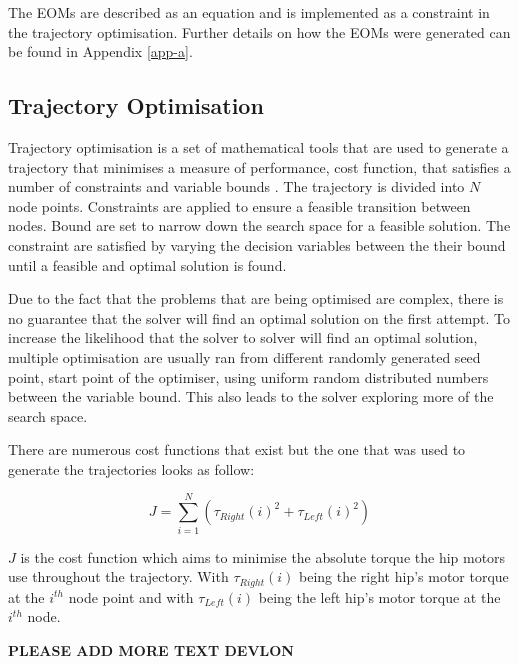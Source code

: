     The EOMs are described as an equation and is implemented as a constraint in the trajectory optimisation. Further details on how the EOMs were generated can be found in Appendix \ref{app-a}.
    
    \subsection{Trajectory Optimisation}
    Trajectory optimisation is a set of mathematical tools that are used to generate a trajectory that minimises a measure of performance, cost function, that satisfies a number of constraints and variable bounds \cite{Fisher-2020}. The trajectory is divided into $N$ node points. Constraints are applied to ensure a feasible transition between nodes. Bound are set to narrow down the search space for a feasible solution. The constraint are satisfied by varying the decision variables between the their bound until a feasible and optimal solution is found.
    
    Due to the fact that the problems that are being optimised are complex, there is no guarantee that the solver will find an optimal solution on the first attempt. To increase the likelihood that the solver to solver will find an optimal solution, multiple optimisation are usually ran from different randomly generated seed point, start point of the optimiser, using uniform random distributed numbers between the variable bound. This also leads to the solver exploring more of the search space.
    
    There are numerous cost functions that exist but the one that was used to generate the trajectories looks as follow: 
    
    \begin{equation} \label{eq:cost}
        J = \sum^N_{i=1} (\tau_{Right}(i)^2 + \tau_{Left}(i)^2)
    \end{equation}
        
    $J$ is the cost function which aims to minimise the absolute torque the hip motors use throughout the trajectory. With $\tau_{Right}(i)$ being the right hip's motor torque at the $i^{th}$ node point and with $\tau_{Left}(i)$ being the left hip's motor torque at the $i^{th}$ node.
    
    \textbf{PLEASE ADD MORE TEXT DEVLON}
    
